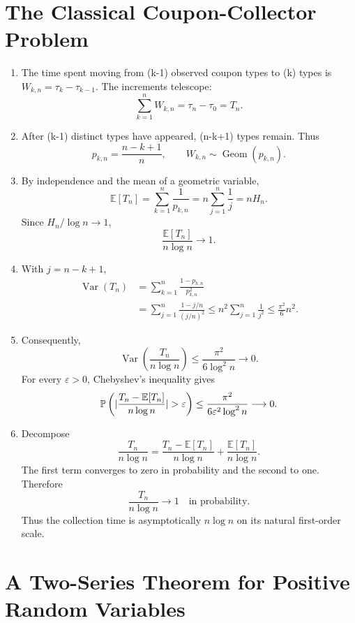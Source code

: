 \documentclass[11pt]{article}
\newcommand{\bbE}{\mathbb{E}}
\newcommand{\bbP}{\mathbb{P}}
\DeclarePairedDelimiter{\abs}{\lvert}{\rvert}
\DeclareMathOperator{\Var}{Var}
\begin{document}
\section{The Classical Coupon-Collector Problem}

\begin{enumerate}
\item The time spent moving from (k-1) observed coupon types to (k)
types is $W_{k,n}=\tau_k-\tau_{k-1}$. The increments telescope:
\[
\sum_{k=1}^nW_{k,n}=\tau_n-\tau_0=T_n.
\]

\item After (k-1) distinct types have appeared, (n-k+1) types remain.
Thus
\[
p_{k,n}=\frac{n-k+1}{n},
\qquad
W_{k,n}\sim\operatorname{Geom}(p_{k,n}).
\]

\item By independence and the mean of a geometric variable,
\[
\bbE[T_n]
=\sum_{k=1}^n\frac1{p_{k,n}}
=n\sum_{j=1}^n\frac1j
=nH_n.
\]
Since $H_n/\log n\to1$,
\[
\frac{\bbE[T_n]}{n\log n}\longrightarrow1.
\]

\item With $j=n-k+1$,
\[
\begin{aligned}
\Var(T_n)
&=\sum_{k=1}^n\frac{1-p_{k,n}}{p_{k,n}^2}\\
&=\sum_{j=1}^n\frac{1-j/n}{(j/n)^2}
\leq n^2\sum_{j=1}^n\frac1{j^2}
\leq\frac{\pi^2}{6}n^2.
\end{aligned}
\]

\item Consequently,
\[
\Var\left(\frac{T_n}{n\log n}\right)
\leq\frac{\pi^2}{6\log^2n}\longrightarrow0.
\]
For every $\varepsilon>0$, Chebyshev's inequality gives
\[
\bbP\left(
\abs{\frac{T_n-\bbE[T_n]}{n\log n}}>\varepsilon
\right)
\leq\frac{\pi^2}{6\varepsilon^2\log^2n}\longrightarrow0.
\]

\item Decompose
\[
\frac{T_n}{n\log n}
=\frac{T_n-\bbE[T_n]}{n\log n}
+\frac{\bbE[T_n]}{n\log n}.
\]
The first term converges to zero in probability and the second to one.
Therefore
\[
\boxed{\frac{T_n}{n\log n}\longrightarrow1\quad\text{in probability}.}
\]
Thus the collection time is asymptotically $n\log n$ on its natural
first-order scale.
\end{enumerate}

\section{A Two-Series Theorem for Positive Random Variables}
\end{document}
